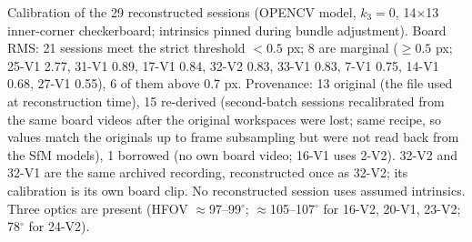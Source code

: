 Calibration of the 29 reconstructed sessions (OPENCV model, $k_3=0$, 14$\times$13 inner-corner checkerboard; intrinsics pinned during bundle adjustment). Board RMS: 21 sessions meet the strict threshold $<0.5$ px; 8 are marginal ($\geq0.5$ px; 25-V1 2.77, 31-V1 0.89, 17-V1 0.84, 32-V2 0.83, 33-V1 0.83, 7-V1 0.75, 14-V1 0.68, 27-V1 0.55), 6 of them above 0.7 px. Provenance: 13 original (the file used at reconstruction time), 15 re-derived (second-batch sessions recalibrated from the same board videos after the original workspaces were lost; same recipe, so values match the originals up to frame subsampling but were not read back from the SfM models), 1 borrowed (no own board video; 16-V1 uses 2-V2). 32-V2 and 32-V1 are the same archived recording, reconstructed once as 32-V2; its calibration is its own board clip. No reconstructed session uses assumed intrinsics. Three optics are present (HFOV $\approx$97--99$^\circ$; $\approx$105--107$^\circ$ for 16-V2, 20-V1, 23-V2; 78$^\circ$ for 24-V2). 

